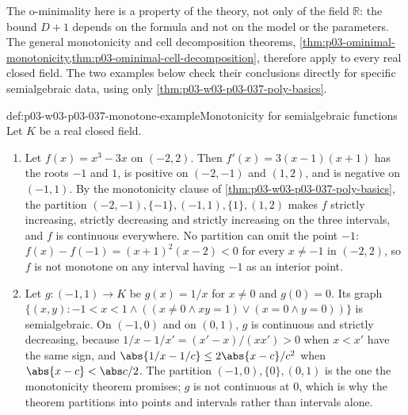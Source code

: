 The o-minimality here is a property of the theory, not only of the field
\(\mathbb R\): the bound \(D+1\) depends on the formula and not on the model
or the parameters.  The general monotonicity and cell decomposition theorems,
\cref{thm:p03-ominimal-monotonicity,thm:p03-ominimal-cell-decomposition},
therefore apply to every real closed field.  The two examples below check
their conclusions directly for specific semialgebraic data, using only
\cref{thm:p03-w03-p03-037-poly-basics}.

\begin{hbexample}{def:p03-w03-p03-037-monotone-example}{Monotonicity for semialgebraic functions}
Let \(K\) be a real closed field.
\begin{enumerate}
\item Let \(f(x)=x^3-3x\) on \((-2,2)\).  Then \(f'(x)=3(x-1)(x+1)\) has the
  roots \(-1\) and \(1\), is positive on \((-2,-1)\) and \((1,2)\), and is
  negative on \((-1,1)\).  By the monotonicity clause of
  \cref{thm:p03-w03-p03-037-poly-basics}, the partition
  \((-2,-1),\{-1\},(-1,1),\{1\},(1,2)\) makes \(f\) strictly increasing,
  strictly decreasing and strictly increasing on the three intervals, and
  \(f\) is continuous everywhere.  No partition can omit the point \(-1\):
  \(f(x)-f(-1)=(x+1)^2(x-2)<0\) for every \(x\neq-1\) in \((-2,2)\), so
  \(f\) is not monotone on any interval having \(-1\) as an interior point.
\item Let \(g:(-1,1)\to K\) be \(g(x)=1/x\) for \(x\neq0\) and \(g(0)=0\).
  Its graph \(\{(x,y):-1<x<1\wedge((x\neq0\wedge xy=1)\vee(x=0\wedge y=0))\}\)
  is semialgebraic.  On \((-1,0)\) and on \((0,1)\), \(g\) is continuous and
  strictly decreasing, because \(1/x-1/x'=(x'-x)/(xx')>0\) when \(x<x'\) have
  the same sign, and \(\abs{1/x-1/c}\leq2\abs{x-c}/c^2\) when
  \(\abs{x-c}<\abs c/2\).  The partition \((-1,0),\{0\},(0,1)\) is the one
  the monotonicity theorem promises; \(g\) is not continuous at \(0\), which
  is why the theorem partitions into points and intervals rather than
  intervals alone.
\end{enumerate}
\end{hbexample}

